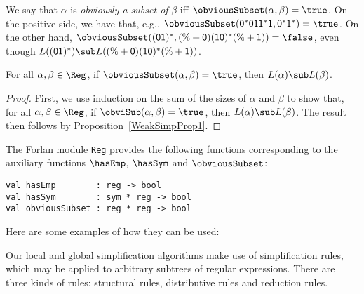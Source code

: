 We say that $\alpha$ is \emph{obviously a subset of} $\beta$ iff
$\obviousSubset(\alpha,\beta)=\true$. On the positive side, we have
that, e.g.,
$\obviousSubset(\mathsf{0^*011^*1},\mathsf{0^*1^*})=\true$.  On the
other hand, $\obviousSubset(\mathsf{(01)^*},\mathsf{(\% + 0)(10)^*(\%
  + 1)})=\false$, even though $L(\mathsf{(01)^*})\sub L(\mathsf{(\% +
  0)(10)^*(\% + 1)})$.

\begin{proposition}
\label{WeakSubProp}
For all $\alpha,\beta\in\Reg$, if $\obviousSubset(\alpha,\beta)=\true$,
then $L(\alpha)\sub L(\beta)$.
\end{proposition}

\begin{proof}
First, we use induction on the sum of the sizes of $\alpha$ and
$\beta$ to show that, for all $\alpha,\beta\in\Reg$, if
$\obviSub(\alpha,\beta)=\true$, then $L(\alpha)\sub L(\beta)$.
The result then follows by Proposition~\ref{WeakSimpProp1}.
\end{proof}

The Forlan module \texttt{Reg} provides the following functions
corresponding to the auxiliary functions $\hasEmp$, $\hasSym$ and
$\obviousSubset$:
\begin{verbatim}
val hasEmp        : reg -> bool
val hasSym        : sym * reg -> bool
val obviousSubset : reg * reg -> bool
\end{verbatim}
Here are some examples of how they can be used:


Our local and global simplification algorithms make use of
simplification rules, which may be applied to arbitrary subtrees of
regular expressions.  There are three kinds of rules: structural
rules, distributive rules and reduction rules.

